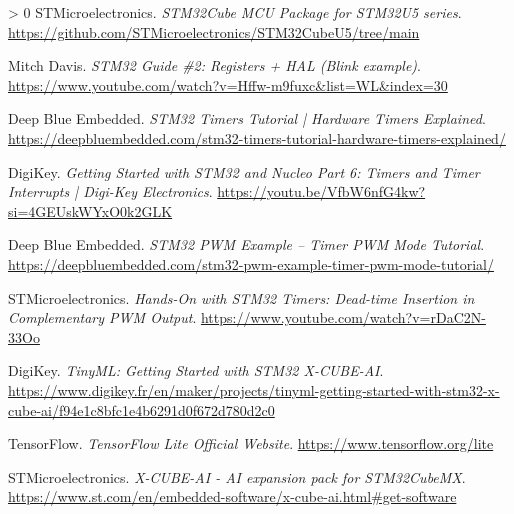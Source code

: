 \documentclass[10pt,a4paper,onecolumn]{article}
\newlength{\cslhangindent}
\newenvironment{CSLReferences}[3] %
 {%
  \setlength{\parindent}{0pt}
  \ifodd #1 \everypar{\setlength{\hangindent}{\cslhangindent}}\ignorespaces\fi
  \ifnum #2 > 0
  \setlength{\parskip}{#2\baselineskip}
  \fi
 }%
 {}
\begin{document}
\begin{CSLReferences}{1}{0}
  \leavevmode\hypertarget{ref-STM32Cube-MCU-Package}{}%
  STMicroelectronics. \textit{STM32Cube MCU Package for STM32U5 series}. \url{https://github.com/STMicroelectronics/STM32CubeU5/tree/main}
  
  \leavevmode\hypertarget{ref-STM32-Guide2-Registers-HAL}{}%
  Mitch Davis. \textit{STM32 Guide \#2: Registers + HAL (Blink example)}. \url{https://www.youtube.com/watch?v=Hffw-m9fuxc&list=WL&index=30}
  
  \leavevmode\hypertarget{ref-STM32-Timers-Tutorial}{}%
  Deep Blue Embedded. \textit{STM32 Timers Tutorial | Hardware Timers Explained}. \url{https://deepbluembedded.com/stm32-timers-tutorial-hardware-timers-explained/}
  
  \leavevmode\hypertarget{ref-Getting-Started-STM32-Nucleo-Timers}{}%
  DigiKey. \textit{Getting Started with STM32 and Nucleo Part 6: Timers and Timer Interrupts | Digi-Key Electronics}. \url{https://youtu.be/VfbW6nfG4kw?si=4GEUskWYxO0k2GLK}
  
  \leavevmode\hypertarget{ref-STM32-PWM-Example}{}%
  Deep Blue Embedded. \textit{STM32 PWM Example – Timer PWM Mode Tutorial}. \url{https://deepbluembedded.com/stm32-pwm-example-timer-pwm-mode-tutorial/}
  
  \leavevmode\hypertarget{ref-STM32-Timers-Dead-time}{}%
  STMicroelectronics. \textit{Hands-On with STM32 Timers: Dead-time Insertion in Complementary PWM Output}. \url{https://www.youtube.com/watch?v=rDaC2N-33Oo}
  
  \leavevmode\hypertarget{ref-TinyML-STM32-X-CUBE-AI}{}%
  DigiKey. \textit{TinyML: Getting Started with STM32 X-CUBE-AI}. \url{https://www.digikey.fr/en/maker/projects/tinyml-getting-started-with-stm32-x-cube-ai/f94e1c8bfc1e4b6291d0f672d780d2c0}
  
  \leavevmode\hypertarget{ref-TensorFlow-Lite}{}%
  TensorFlow. \textit{TensorFlow Lite Official Website}. \url{https://www.tensorflow.org/lite}
  
  \leavevmode\hypertarget{ref-X-CUBE-AI-Package}{}%
  STMicroelectronics. \textit{X-CUBE-AI - AI expansion pack for STM32CubeMX}. \url{https://www.st.com/en/embedded-software/x-cube-ai.html#get-software}
  
  \end{CSLReferences}
  
\end{document}
